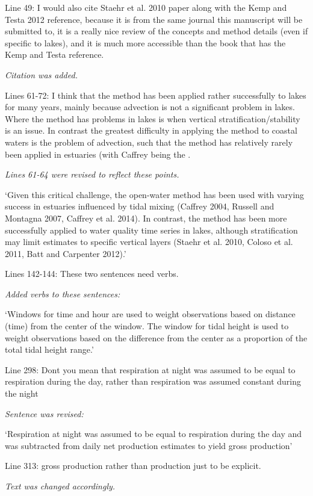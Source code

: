 \documentclass[letterpaper,12pt]{article}\usepackage[]{graphicx}\usepackage[]{color}
\begin{document}
Line 49: I would also cite Staehr et al. 2010 paper along with the Kemp and Testa 2012 reference, because it is from the same journal this manuscript will be submitted to, it is a really nice review of the concepts and method details (even if specific to lakes), and it is much more accessible than the book that has the Kemp and Testa reference.

{\it Citation was added.}

Lines 61-72: I think that the method has been applied rather successfully to lakes for many years, mainly because advection is not a significant problem in lakes. Where the method has problems in lakes is when vertical stratification/stability is an issue. In contrast the greatest difficulty in applying the method to coastal waters is the problem of advection, such that the method has relatively rarely been applied in estuaries (with Caffrey being the .

{\it Lines 61-64 were revised to reflect these points.

`Given this critical challenge, the open-water method has been used with varying success in estuaries influenced by tidal mixing (Caffrey 2004, Russell and Montagna 2007, Caffrey et al. 2014).  In contrast, the method has been more successfully applied to water quality time series in lakes, although stratification may limit estimates to specific vertical layers (Staehr et al. 2010, Coloso et al. 2011, Batt and Carpenter 2012).'
}

Lines 142-144: These two sentences need verbs.

{\it Added verbs to these sentences:

`Windows for time and hour are used to weight observations based on distance (time) from the center of the window.  The window for tidal height is used to weight observations based on the difference from the center as a proportion of the total tidal height range.'
}

Line 298: Dont you mean that respiration at night was assumed to be equal to respiration during the day, rather than respiration was assumed constant during the night

{\it Sentence was revised:

`Respiration at night was assumed to be equal to respiration during the day and was subtracted from daily net production estimates to yield gross production'
}

Line 313: gross production rather than production just to be explicit.

{\it Text was changed accordingly.}
\end{document}
